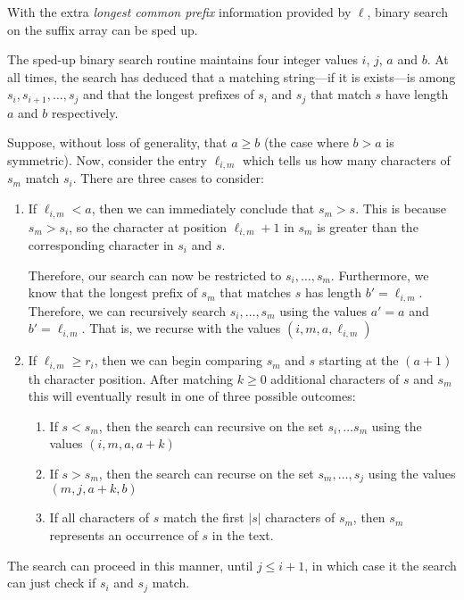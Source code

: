 With the extra \emph{longest common prefix} information provided by $\ell$, binary search on the suffix array can be sped up.

The sped-up binary search routine maintains four integer values $i$, $j$,
$a$ and $b$.  At all times, the search has deduced that a matching
string---if it is exists---is among $s_i,s_{i+1},\ldots,s_j$ and that 
the longest prefixes of $s_i$ and $s_j$ that match $s$
have length $a$ and $b$ respectively.

Suppose, without loss of generality, that $a \ge b$ (the case where $b>a$ is symmetric).  Now, consider the entry $\ell_{i,m}$ which tells us how many characters of $s_m$ match $s_i$.  There are three cases to consider:
\begin{enumerate}
\item If $\ell_{i,m}< a$, then we can immediately conclude that $s_m > s$. This is because $s_m > s_i$, so the character at position 
$\ell_{i,m}+1$ in $s_m$ is greater than the corresponding character in $s_i$ and $s$.

Therefore, our search can now be restricted to $s_i,\ldots,s_{m}$.  Furthermore, we know that the longest prefix of $s_m$ that matches $s$ has length $b'=\ell_{i,m}$.  Therefore, we can recursively search $s_i,\ldots,s_{m}$ using the values $a'=a$ and $b'=\ell_{i,m}$. That is, we recurse with the values $(i,m,a,\ell_{i,m})$

\item If $\ell_{i,m}\ge r_i$, then we can begin comparing $s_m$ and $s$ starting at the $(a+1)$th character position. After matching $k\ge0$ additional characters of $s$ and $s_m$ this will eventually result in one of three possible outcomes:
\begin{enumerate}
  \item If $s < s_m$, then the search can recursive on the set $s_i,\ldots s_m$ using the values $(i,m,a,a+k)$

  \item If $s > s_m$, then the search can recurse on the set $s_m,\ldots,s_j$ using the values $(m,j,a+k, b)$

  \item If all characters of $s$ match the first $|s|$ characters of $s_m$, then $s_m$ represents an occurrence of $s$ in the text.
\end{enumerate}
\end{enumerate}

The search can proceed in this manner, until $j \le i+1$, in which case it the search can just check if $s_i$ and $s_j$ match.

